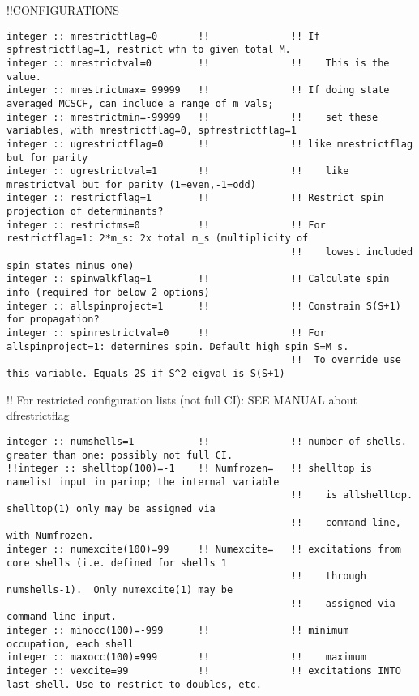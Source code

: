 !!{\large \quad CONFIGURATIONS}
\begin{verbatim}
integer :: mrestrictflag=0       !!              !! If spfrestrictflag=1, restrict wfn to given total M.
integer :: mrestrictval=0        !!              !!    This is the value.
integer :: mrestrictmax= 99999   !!              !! If doing state averaged MCSCF, can include a range of m vals;
integer :: mrestrictmin=-99999   !!              !!    set these variables, with mrestrictflag=0, spfrestrictflag=1
integer :: ugrestrictflag=0      !!              !! like mrestrictflag but for parity
integer :: ugrestrictval=1       !!              !!    like mrestrictval but for parity (1=even,-1=odd)
integer :: restrictflag=1        !!              !! Restrict spin projection of determinants?
integer :: restrictms=0          !!              !! For restrictflag=1: 2*m_s: 2x total m_s (multiplicity of 
                                                 !!    lowest included spin states minus one)
integer :: spinwalkflag=1        !!              !! Calculate spin info (required for below 2 options)
integer :: allspinproject=1      !!              !! Constrain S(S+1) for propagation?
integer :: spinrestrictval=0     !!              !! For allspinproject=1: determines spin. Default high spin S=M_s.
                                                 !!  To override use this variable. Equals 2S if S^2 eigval is S(S+1)
\end{verbatim}
!! {\large \quad For restricted configuration lists (not full CI): SEE MANUAL about dfrestrictflag}
\begin{verbatim}
integer :: numshells=1           !!              !! number of shells.  greater than one: possibly not full CI. 
!!integer :: shelltop(100)=-1    !! Numfrozen=   !! shelltop is namelist input in parinp; the internal variable 
                                                 !!    is allshelltop.   shelltop(1) only may be assigned via 
                                                 !!    command line, with Numfrozen.
integer :: numexcite(100)=99     !! Numexcite=   !! excitations from core shells (i.e. defined for shells 1 
                                                 !!    through numshells-1).  Only numexcite(1) may be 
                                                 !!    assigned via command line input.
integer :: minocc(100)=-999      !!              !! minimum occupation, each shell
integer :: maxocc(100)=999       !!              !!    maximum
integer :: vexcite=99            !!              !! excitations INTO last shell. Use to restrict to doubles, etc.
\end{verbatim}
